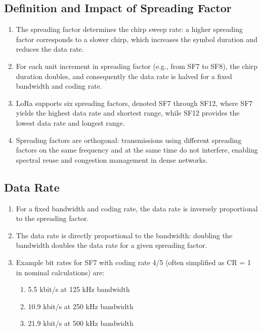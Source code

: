 \subsection{Definition and Impact of Spreading Factor}

\begin{enumerate}
    \item The spreading factor determines the chirp sweep rate: a higher spreading factor corresponds to a slower chirp, which increases the symbol duration and reduces the data rate.
    \item For each unit increment in spreading factor (e.g., from SF7 to SF8), the chirp duration doubles, and consequently the data rate is halved for a fixed bandwidth and coding rate.
    \item LoRa supports six spreading factors, denoted SF7 through SF12, where SF7 yields the highest data rate and shortest range, while SF12 provides the lowest data rate and longest range.
    \item Spreading factors are orthogonal: transmissions using different spreading factors on the same frequency and at the same time do not interfere, enabling spectral reuse and congestion management in dense networks.
\end{enumerate}

\subsection{Data Rate}

\begin{enumerate}
    \item For a fixed bandwidth and coding rate, the data rate is inversely proportional to the spreading factor.
    \item The data rate is directly proportional to the bandwidth: doubling the bandwidth doubles the data rate for a given spreading factor.
    \item Example bit rates for SF7 with coding rate 4/5 (often simplified as CR = 1 in nominal calculations) are:
          \begin{enumerate}
              \item 5.5 kbit/s at 125 kHz bandwidth
              \item 10.9 kbit/s at 250 kHz bandwidth
              \item 21.9 kbit/s at 500 kHz bandwidth
          \end{enumerate}
\end{enumerate}

